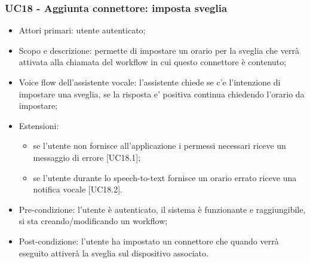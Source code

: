 
\clearpage
\subsubsection{UC18 - Aggiunta connettore: imposta sveglia}
\begin{itemize}
	\item  Attori primari: utente autenticato;
	\item  Scopo e descrizione: permette di impostare un orario per la sveglia che verrà attivata alla chiamata del workflow in cui questo connettore è contenuto;
	\item  Voice flow dell'assistente vocale: l'assistente chiede se c'e l'intenzione di impostare una sveglia, se la risposta e' positiva continua chiedendo l'orario da impostare;
	\item  Estensioni: 
		   \begin{itemize}
				\item se l'utente non fornisce all'applicazione i permessi necessari riceve un messaggio di errore [UC18.1];
				\item se l'utente durante lo speech-to-text fornisce un orario errato riceve una notifica vocale [UC18.2].
		   \end{itemize}
	\item  Pre-condizione: l'utente è autenticato, il sistema è funzionante e raggiungibile, si sta creando/modificando un workflow;
	\item  Post-condizione: l'utente ha impostato un connettore che quando verrà eseguito attiverà la sveglia sul dispositivo associato.
\end{itemize}
